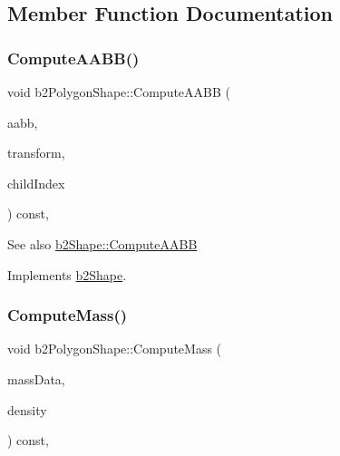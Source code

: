 \subsection{Member Function Documentation}
\mbox{\label{classb2PolygonShape_ae9bcc185caf4a030003cefc4576e4717}} 
\subsubsection{\texorpdfstring{Compute\+A\+A\+B\+B()}{ComputeAABB()}}
{\footnotesize\ttfamily void b2\+Polygon\+Shape\+::\+Compute\+A\+A\+BB (\begin{DoxyParamCaption}\item[{\mbox{\hyperlink{structb2AABB}{b2\+A\+A\+BB}} $\ast$}]{aabb,  }\item[{const \mbox{\hyperlink{structb2Transform}{b2\+Transform}} \&}]{transform,  }\item[{int32}]{child\+Index }\end{DoxyParamCaption}) const\hspace{0.3cm}{\ttfamily [override]}, {\ttfamily [virtual]}}

\begin{DoxySeeAlso}{See also}
\mbox{\hyperlink{classb2Shape_a88e9807fab0c8ca9a98d8926e50a1411}{b2\+Shape\+::\+Compute\+A\+A\+BB}} 
\end{DoxySeeAlso}


Implements \mbox{\hyperlink{classb2Shape_a88e9807fab0c8ca9a98d8926e50a1411}{b2\+Shape}}.

\mbox{\label{classb2PolygonShape_a908db2a51fc79fd49d6fe06be2cd8474}} 
\subsubsection{\texorpdfstring{Compute\+Mass()}{ComputeMass()}}
{\footnotesize\ttfamily void b2\+Polygon\+Shape\+::\+Compute\+Mass (\begin{DoxyParamCaption}\item[{\mbox{\hyperlink{structb2MassData}{b2\+Mass\+Data}} $\ast$}]{mass\+Data,  }\item[{float32}]{density }\end{DoxyParamCaption}) const\hspace{0.3cm}{\ttfamily [override]}, {\ttfamily [virtual]}}

